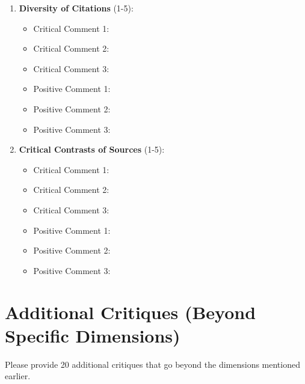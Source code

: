 \documentclass[12pt]{article}
\begin{document}
\begin{enumerate}
    \item \textbf{Diversity of Citations} (1-5): \underline{\hspace{2cm}}
    \begin{itemize}
        \item Critical Comment 1: \underline{\hspace{12cm}}
        \item Critical Comment 2: \underline{\hspace{12cm}}
        \item Critical Comment 3: \underline{\hspace{12cm}}
        \item Positive Comment 1: \underline{\hspace{12cm}}
        \item Positive Comment 2: \underline{\hspace{12cm}}
        \item Positive Comment 3: \underline{\hspace{12cm}}
    \end{itemize}

    \vspace{0.5cm}

    \item \textbf{Critical Contrasts of Sources} (1-5): \underline{\hspace{2cm}}
    \begin{itemize}
        \item Critical Comment 1: \underline{\hspace{12cm}}
        \item Critical Comment 2: \underline{\hspace{12cm}}
        \item Critical Comment 3: \underline{\hspace{12cm}}
        \item Positive Comment 1: \underline{\hspace{12cm}}
        \item Positive Comment 2: \underline{\hspace{12cm}}
        \item Positive Comment 3: \underline{\hspace{12cm}}
    \end{itemize}

\end{enumerate}

\newpage

\section*{Additional Critiques (Beyond Specific Dimensions)}
\noindent Please provide 20 additional critiques that go beyond the dimensions mentioned earlier. 
\end{document}
